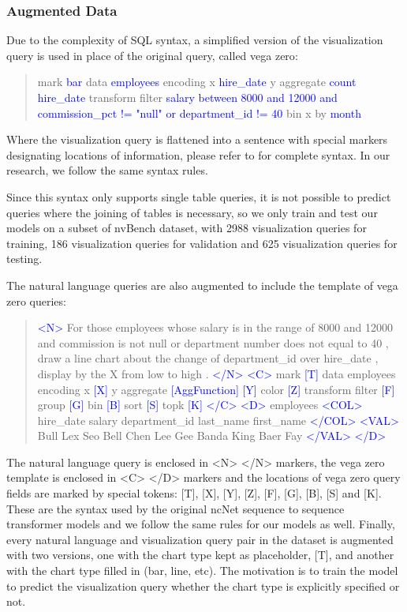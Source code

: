 \documentclass[
	a4paper, %
	10pt, %
	unnumberedsections, %
	twoside, %
]{t0003}
\newcommand{\blue}[1]{\textcolor{blue}{#1}}
\begin{document}
\subsubsection{Augmented Data} Due to the complexity of SQL syntax, a simplified version of the visualization query is used in place of the original query, called vega zero\cite{Luo:2022qr}:

\begin{quote}
mark \blue{bar} data \blue{employees} encoding x \blue{hire\_date} y aggregate \blue{count hire\_date} transform filter \blue{salary between 8000 and 12000 and commission\_pct != "null" or department\_id != 40} bin x by \blue{month}	
\end{quote}

Where the visualization query is flattened into a sentence with special markers designating locations of information, please refer to \cite{Luo:2022qr} for complete syntax. In our research, we follow the same syntax rules.

Since this syntax only supports single table queries, it is not possible to predict queries where the joining of tables is necessary, so we only train and test our models on a subset of nvBench dataset, with 2988 visualization queries for training, 186 visualization queries for validation and 625 visualization queries for testing.

The natural language queries are also augmented to include the template of vega zero queries:

\begin{quote}
\blue{<N>} For those employees whose salary is in the range of 8000 and 12000 and commission is not null or department number does not equal to 40 , draw a line chart about the change of department\_id over hire\_date , display by the X from low to high . \blue{</N>} \blue{<C>} mark \blue{[T]} data employees encoding x \blue{[X]} y aggregate \blue{[AggFunction] [Y]} color \blue{[Z]} transform filter \blue{[F]} group \blue{[G]} bin \blue{[B]} sort \blue{[S]} topk \blue{[K] </C> <D>} employees \blue{<COL>} hire\_date salary department\_id last\_name first\_name \blue{</COL> <VAL>} Bull Lex Seo Bell Chen Lee Gee Banda King Baer Fay \blue{</VAL> </D>}
\end{quote}

The natural language query is enclosed in <N> </N> markers, the vega zero template is enclosed in <C> </D> markers and the locations of vega zero query fields are marked by special tokens: [T], [X], [Y], [Z], [F], [G], [B], [S] and [K]. These are the syntax used by the original ncNet sequence to sequence transformer models and we follow the same rules for our models as well.
Finally, every natural language and visualization query pair in the dataset is augmented with two versions, one with the chart type kept as placeholder, [T], and another with the chart type filled in (bar, line, etc). The motivation is to train the model to predict the visualization query whether the chart type is explicitly specified or not.
\end{document}
